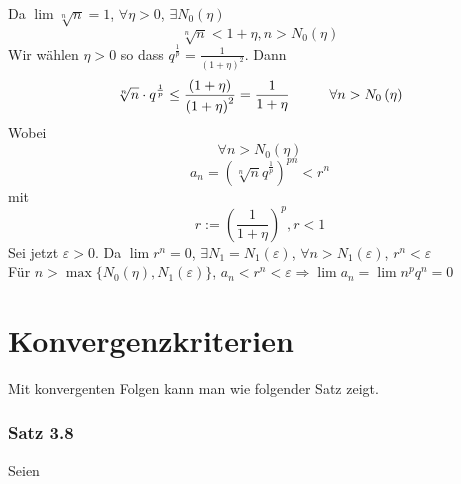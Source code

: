 Da $\lim\sqrt[n]{n}=1$, $\forall\eta >0$, $\exists N_0(\eta)$ \[\sqrt[n]{n}<1+\eta, n>N_0(\eta)\]
Wir wählen $\eta >0$ so dass ${q^{\frac{1}{p}}} = \frac{1}{{{{\left( {1 + \eta } \right)}^2}}}$. Dann
\[\sqrt[n]{n}\cdot q^{\frac{1}{p}}\leq\frac{\left( 1+\eta\right)}{\left( 1+\eta\right)^2}=\frac{1}{1+\eta}\hspace{10mm} \forall n>N_0\left(\eta\right)\]
Wobei \[\forall n>N_0\left(\eta\right)\]\[a_n=\left( \sqrt[n]{n}q^{\frac{1}{p}}\right)^{pn}<r^n\] mit \[r:=\left( \frac{1}{1+\eta}\right)^p, r<1\]
Sei jetzt $\varepsilon>0$. Da $\lim r^n=0$, $\exists N_1=N_1(\varepsilon)$, $\forall n>N_1(\varepsilon)$, $r^n<\varepsilon$\\

\noindent Für $n>\max\{N_0\left(\eta\right), N_1(\varepsilon)\}$, $a_n<r^n<\varepsilon \Rightarrow \lim a_n=\lim n^pq^n=0$ 

\section{Konvergenzkriterien}
Mit konvergenten Folgen kann man  wie folgender Satz zeigt.
\subsubsection*{Satz 3.8}
Seien
